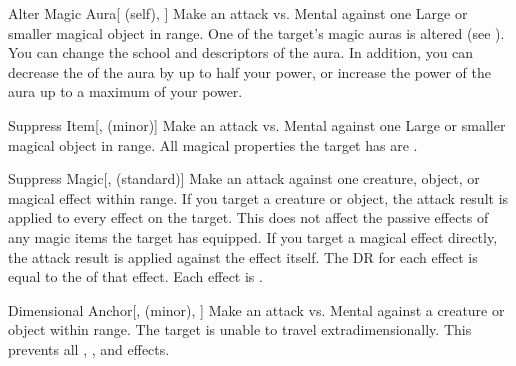 \lowercase{\hypertarget{spell:Alter Magic Aura}{}}\label{spell:Alter Magic Aura}
\begin{attuneability}[\nth{1}]{\hypertarget{spell:Alter Magic Aura}{Alter Magic Aura}}[ (self), ]
Make an attack vs. Mental against one Large or smaller magical object in \rngmed range.
\hit One of the target's magic auras is altered (see ).
You can change the school and descriptors of the aura.
In addition, you can decrease the  of the aura by up to half your power, or increase the power of the aura up to a maximum of your power.
\end{attuneability}
\vspace{0.25em}



\lowercase{\hypertarget{spell:Suppress Item}{}}\label{spell:Suppress Item}
\begin{freeability}[\nth{1}]{\hypertarget{spell:Suppress Item}{Suppress Item}}[,  (minor)]
Make an attack vs. Mental against one Large or smaller magical object in \rngmed range.
\hit All magical properties the target has are .
\end{freeability}
\vspace{0.25em}



\lowercase{\hypertarget{spell:Suppress Magic}{}}\label{spell:Suppress Magic}
\begin{freeability}[\nth{1}]{\hypertarget{spell:Suppress Magic}{Suppress Magic}}[,  (standard)]
Make an attack against one creature, object, or magical effect within \rngmed range.
If you target a creature or object, the attack result is applied to every  effect on the target.
This does not affect the passive effects of any magic items the target has equipped.
If you target a magical effect directly, the attack result is applied against the effect itself.
The DR for each effect is equal to the  of that effect.
\hit Each effect is .
\end{freeability}
\vspace{0.25em}



\lowercase{\hypertarget{spell:Dimensional Anchor}{}}\label{spell:Dimensional Anchor}
\begin{freeability}[\nth{2}]{\hypertarget{spell:Dimensional Anchor}{Dimensional Anchor}}[,  (minor), ]
Make an attack vs. Mental against a creature or object within \rngmed range.
\hit The target is unable to travel extradimensionally.
This prevents all , , and  effects.
\end{freeability}
\vspace{0.25em}



